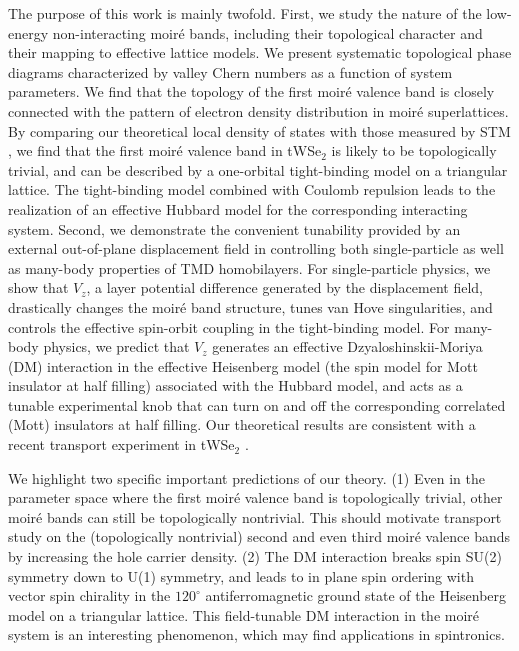 \documentclass[aps,prx,floatfix,twocolumn]{revtex4-1}
\begin{document}
    The purpose of this work is mainly twofold. First, we study the nature of the low-energy non-interacting moir\'e  bands, including their topological character and their mapping to effective lattice models. We present systematic topological phase diagrams characterized by valley Chern numbers as a function of system parameters. %
    We find that the topology of the first moir\'e valence band is closely connected with the pattern of electron density distribution in moir\'e superlattices. By comparing our theoretical local density of states with those measured by STM \cite{zhang2020flat}, we find that the first moir\'e valence band in tWSe$_2$ is likely to be topologically trivial, and can be described by a one-orbital tight-binding model on a triangular lattice. The tight-binding model combined with Coulomb repulsion leads to the realization of an effective Hubbard model for the corresponding interacting system. Second, we demonstrate the convenient tunability provided by an external out-of-plane displacement field in controlling both single-particle as well as many-body properties of TMD homobilayers. For single-particle physics, we show that $V_z$, a layer potential difference generated by the displacement field,  drastically changes the moir\'e band structure, tunes van Hove singularities, and controls the effective spin-orbit coupling in the tight-binding model. For many-body physics, we predict that $V_z$ generates an effective Dzyaloshinskii-Moriya (DM) interaction in the effective Heisenberg model (the spin model for Mott insulator at half filling) associated with the Hubbard model, and acts as a tunable experimental knob that can turn on and off the corresponding correlated (Mott) insulators at half filling. Our theoretical results are consistent with a recent transport experiment in tWSe$_2$ \cite{wang2019magic}. 
    
    We highlight two specific important predictions of our theory. 
    (1) Even in the parameter space where the first moir\'e valence band is topologically trivial, other moir\'e bands can still be topologically nontrivial. This should motivate transport study on the (topologically nontrivial) second and even third moir\'e valence bands by increasing the hole carrier density.
    (2) The  DM interaction breaks spin SU(2) symmetry down to U(1) symmetry, and leads to in plane spin ordering with vector spin chirality in the $120^{\circ}$ antiferromagnetic ground state of the Heisenberg model on a triangular lattice. This field-tunable DM interaction in the moir\'e system is an interesting phenomenon, which may find applications in spintronics.
	
\end{document}
